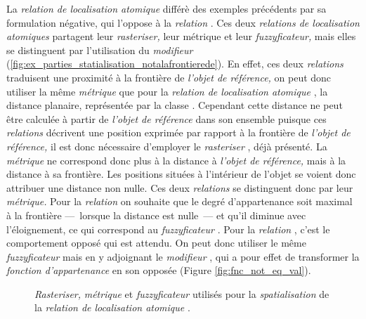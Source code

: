 La \emph{relation de localisation atomique}
 différè des exemples
précédents par sa formulation négative, qui l'oppose à la
\emph{relation} . Ces deux
\emph{relations de localisation atomiques} partagent leur
\emph{rasteriser,} leur métrique et leur \emph{fuzzyficateur,} mais
elles se distinguent par l'utilisation du \emph{modifieur}
(\autoref{fig:ex_parties_statialisation_notalafrontierede}). En effet,
ces deux \emph{relations} traduisent une proximité à la frontière de
\emph{l'objet de référence,} on peut donc utiliser la même
\emph{métrique} que pour la \emph{relation de localisation atomique}
\protect{}, la distance
planaire, représentée par la classe . Cependant
cette distance ne peut être calculée à partir de \emph{l'objet de
  référence} dans son ensemble puisque ces \emph{relations} décrivent
une position exprimée par rapport à la frontière de \emph{l'objet de
  référence,} il est donc nécessaire d'employer le \emph{rasteriser}
, déjà présenté. La \emph{métrique} ne
correspond donc plus à la distance à \emph{l'objet de référence,} mais
à la distance à sa frontière. Les positions situées à l'intérieur de
l'objet se voient donc attribuer une distance non nulle. Ces deux
\emph{relations} se distinguent donc par leur \emph{métrique.} Pour la
\emph{relation}  on souhaite que
le degré d'appartenance soit maximal à la frontière ---~lorsque la
distance est nulle~--- et qu'il diminue avec l'éloignement, ce qui
correspond au \emph{fuzzyficateur} . Pour la
\emph{relation} , c'est le
comportement opposé qui est attendu. On peut donc utiliser le même
\emph{fuzzyficateur} mais en y adjoignant le \emph{modifieur}
, qui a pour effet de transformer la \emph{fonction
  d'appartenance} en son opposée (Figure \ref{fig:fnc_not_eq_val}).

\begin{figure}
  \centering  
  \caption{\emph{Rasteriser,} \emph{métrique} et \emph{fuzzyficateur}
    utilisés pour la \emph{spatialisation} de la \emph{relation de
      localisation atomique}
    \protect{}.}
  \label{fig:ex_parties_statialisation_notalafrontierede}
\end{figure}

